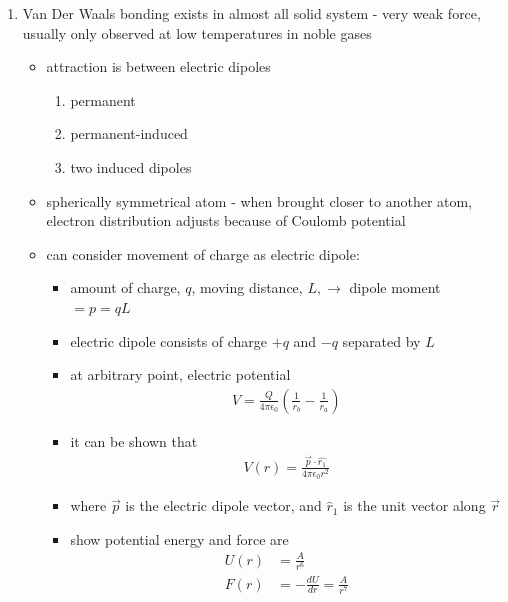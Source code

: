 \documentclass[a4paper,11pt,normalem]{article}
\begin{document}
\begin{enumerate}
    \item Van Der Waals bonding exists in almost all solid system - very weak force, usually only observed at low temperatures in noble gases
        \begin{itemize}
            \item attraction is between electric dipoles
                \begin{enumerate}
                    \item permanent
                    \item permanent-induced
                    \item two induced dipoles
                \end{enumerate}
            \item spherically symmetrical atom - when brought closer to another atom, electron distribution adjusts because of Coulomb potential
            \item can consider movement of charge as electric dipole:
                \begin{itemize}
                    \item amount of charge, \(q\), moving distance, \(L, \to\) dipole moment \(= p = qL\)
                    \item electric dipole consists of charge \(+q\) and \(-q\) separated by \(L\)
                    \item at arbitrary point, electric potential
                        \begin{align*}
                            V = \frac{Q}{4\pi \epsilon_0}\left(\frac{1}{r_b} - \frac{1}{r_a}\right)
                        \end{align*}
                    \item it can be shown that
                        \begin{align*}
                            V(r) = \frac{\vec{p}\cdot\hat{r_1}}{4\pi \epsilon_0 r^2}
                        \end{align*}
                    \item where \(\vec{p}\) is the electric dipole vector, and \(\hat{r}_1\) is the unit vector along \(\vec{r}\)
                    \item show potential energy and force are
                        \begin{align*}
                            U(r) &= \frac{A}{r^6} \\
                            F(r) &= -\frac{dU}{dr} = \frac{A}{r^7}

\end{align*}
\end{itemize}
\end{itemize}
\end{enumerate}
\end{document}
